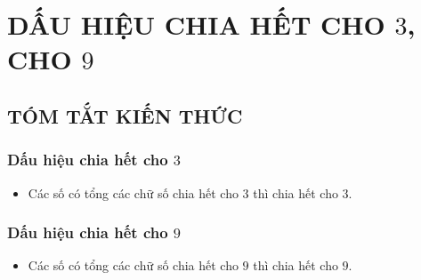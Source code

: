 \section{DẤU HIỆU CHIA HẾT CHO $3$, CHO $9$}
\subsection{TÓM TẮT KIẾN THỨC}
\begin{tomtat}
	\subsubsection{Dấu hiệu chia hết cho $3$}
\begin{itemize}
\item Các số có tổng các chữ số chia hết cho $3$ thì chia hết cho $3$.
\end{itemize}
	\subsubsection{Dấu hiệu chia hết cho $9$}
\begin{itemize}
\item Các số có tổng các chữ số chia hết cho $9$ thì chia hết cho $9$.
\end{itemize}

\end{tomtat}
